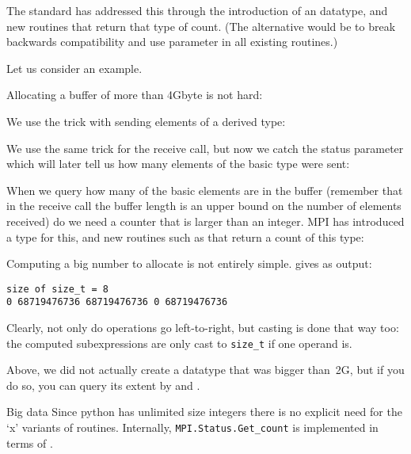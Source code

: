 The  standard has addressed this
through the introduction of an  datatype,
and new routines that return that type of count.
(The alternative would be to break backwards compatibility
and use  parameter in all existing routines.)

Let us consider an example.

Allocating a buffer of more than 4Gbyte is not hard:

We use the trick with sending elements of a derived type:

We use the same trick for the receive call, but now we catch the status
parameter which will later tell us how many elements of the basic type
were sent:
%

When we query how many of the basic elements are in the buffer
(remember that in the receive call the buffer length is
an upper bound on the number of elements received)
do we
need a counter that is larger than an integer.  MPI has introduced a
type  for this, and new routines such as
 that return a
count of this type:


\begin{remark}
  Computing a big number to allocate is not entirely simple.
  gives as output:
\begin{verbatim}
size of size_t = 8
0 68719476736 68719476736 0 68719476736
\end{verbatim}
Clearly, not only do operations go left-to-right, but casting is done that way too:
the computed subexpressions are only cast to \lstinline{size_t} if one operand is.
\end{remark}

Above, we did not actually create a datatype that was bigger than~2G,
but if you do so, you can query its extent by
and
.

\begin{pythonnote}{Big data}
  Since python has unlimited size integers there is
  no explicit need for the `x' variants of routines.
  Internally, \lstinline+MPI.Status.Get_count+ is implemented
  in terms of .
\end{pythonnote}

